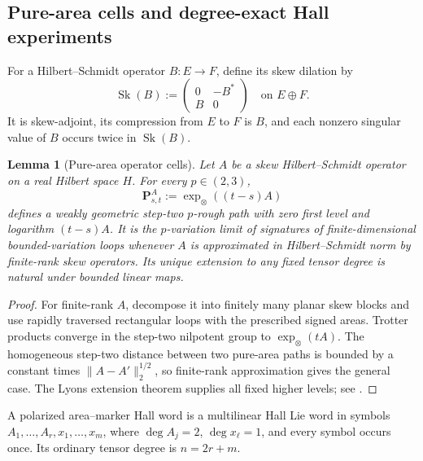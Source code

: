\documentclass[10pt,reqno]{amsart}
\theoremstyle{plain}
\newtheorem{lemma}[theorem]{Lemma}
\theoremstyle{definition}
\theoremstyle{remark}
\begin{document}
\subsection{Pure-area cells and degree-exact Hall experiments}
\label{hall:subsec-pure-area}

For a Hilbert--Schmidt operator $B:E\to F$, define its skew dilation by
\begin{equation}
 \operatorname{Sk}(B):=
 \begin{pmatrix}0&-B^*\\ B&0\end{pmatrix}
 \quad\text{on }E\oplus F.
 \label{hall:eq-skew-dilation}
\end{equation}
It is skew-adjoint, its compression from $E$ to $F$ is $B$, and each nonzero
singular value of $B$ occurs twice in $\operatorname{Sk}(B)$.

\begin{lemma}[Pure-area operator cells]
\label{hall:lem-pure-area}
Let $A$ be a skew Hilbert--Schmidt operator on a real Hilbert space $H$.  For
every $p\in(2,3)$,
\begin{equation}
 \mathbf P^A_{s,t}:=\exp_\otimes((t-s)A)
 \label{hall:eq-pure-area-path}
\end{equation}
defines a weakly geometric step-two $p$-rough path with zero first level and
logarithm $(t-s)A$.  It is the $p$-variation limit of signatures of
finite-dimensional bounded-variation loops whenever $A$ is approximated in
Hilbert--Schmidt norm by finite-rank skew operators.  Its unique extension to
any fixed tensor degree is natural under bounded linear maps.
\end{lemma}

\begin{proof}
For finite-rank $A$, decompose it into finitely many planar skew blocks and
use rapidly traversed rectangular loops with the prescribed signed areas.
Trotter products converge in the step-two nilpotent group to
$\exp_\otimes(tA)$.  The homogeneous step-two distance between two pure-area
paths is bounded by a constant times $\|A-A'\|_2^{1/2}$, so finite-rank
approximation gives the general case.  The Lyons extension theorem supplies
all fixed higher levels; see \cite{FrizVictoir10,Lyons98}.
\end{proof}

A polarized area--marker Hall word is a multilinear Hall Lie word in symbols
$A_1,\ldots,A_r,x_1,\ldots,x_m$, where $\deg A_j=2$,
$\deg x_\ell=1$, and every symbol occurs once.  Its ordinary tensor degree is
$n=2r+m$.
\end{document}
